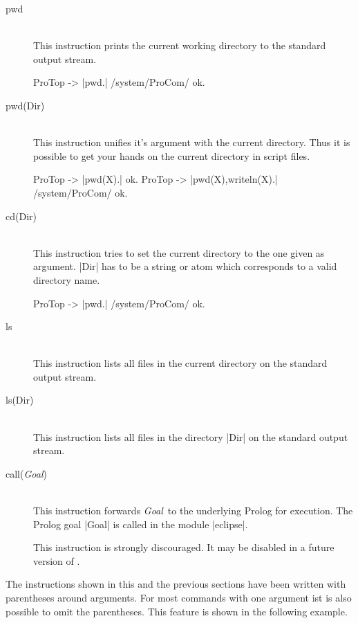 \begin{description}
  \item [pwd]\ 
    \\
    This instruction prints the current working directory to the standard
    output stream.
\begin{BoxedSample}
  ProTop -> |pwd.|
  /system/ProCom/
  ok.
\end{BoxedSample}

  \item [pwd(Dir)]\ 
    \\
    This instruction unifies it's argument with the current directory. Thus it
    is possible to get your hands on the current directory in script files.
\begin{BoxedSample}
  ProTop -> |pwd(X).|
  ok.
  ProTop -> |pwd(X),writeln(X).|
  /system/ProCom/
  ok.
\end{BoxedSample}

  \item [cd(Dir)]\ \\
  This instruction tries to set the current directory to the one given as
  argument. |Dir| has to be a string or atom which corresponds to a valid
  directory name.
\begin{BoxedSample}
  ProTop -> |pwd.|
  /system/ProCom/
  ok.
\end{BoxedSample}

  \item [ls]\ \\
  This instruction lists all files in the current directory on the standard
  output stream.


  \item [ls(Dir)]\ \\
  This instruction lists all files in the directory |Dir| on the standard
  output stream.

  \item [call({\em Goal})]\ \\
  This instruction forwards {\em Goal}\ to the underlying Prolog for execution.
  The Prolog goal |Goal| is called in the module |eclipse|.

  This instruction is strongly discouraged. It may be disabled in a future
  version of \ProTop.
\end{description}

The \ProTop{} instructions shown in this and the previous sections have been
written with parentheses around arguments. For most commands with one argument
ist is also possible to omit the parentheses. This feature is shown in the
following example.

